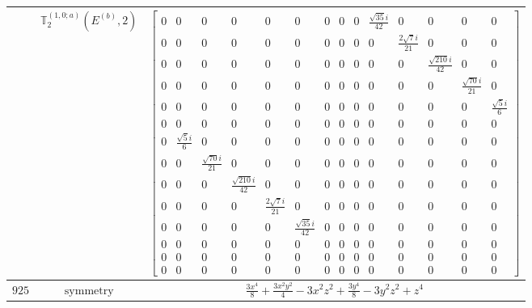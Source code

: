 \documentclass[fleqn,8pt,landscape]{jsarticle}
\begin{document}
\begin{longtable}{ccc}
$  $ & $ \mathbb{T}_{2}^{(1,0;a)}(E^{(b)},2) $ & $ \begin{bmatrix} 0 & 0 & 0 & 0 & 0 & 0 & 0 & 0 & 0 & \frac{\sqrt{35} i}{42} & 0 & 0 & 0 & 0 \\ 0 & 0 & 0 & 0 & 0 & 0 & 0 & 0 & 0 & 0 & \frac{2 \sqrt{7} i}{21} & 0 & 0 & 0 \\ 0 & 0 & 0 & 0 & 0 & 0 & 0 & 0 & 0 & 0 & 0 & \frac{\sqrt{210} i}{42} & 0 & 0 \\ 0 & 0 & 0 & 0 & 0 & 0 & 0 & 0 & 0 & 0 & 0 & 0 & \frac{\sqrt{70} i}{21} & 0 \\ 0 & 0 & 0 & 0 & 0 & 0 & 0 & 0 & 0 & 0 & 0 & 0 & 0 & \frac{\sqrt{5} i}{6} \\ 0 & 0 & 0 & 0 & 0 & 0 & 0 & 0 & 0 & 0 & 0 & 0 & 0 & 0 \\ 0 & \frac{\sqrt{5} i}{6} & 0 & 0 & 0 & 0 & 0 & 0 & 0 & 0 & 0 & 0 & 0 & 0 \\ 0 & 0 & \frac{\sqrt{70} i}{21} & 0 & 0 & 0 & 0 & 0 & 0 & 0 & 0 & 0 & 0 & 0 \\ 0 & 0 & 0 & \frac{\sqrt{210} i}{42} & 0 & 0 & 0 & 0 & 0 & 0 & 0 & 0 & 0 & 0 \\ 0 & 0 & 0 & 0 & \frac{2 \sqrt{7} i}{21} & 0 & 0 & 0 & 0 & 0 & 0 & 0 & 0 & 0 \\ 0 & 0 & 0 & 0 & 0 & \frac{\sqrt{35} i}{42} & 0 & 0 & 0 & 0 & 0 & 0 & 0 & 0 \\ 0 & 0 & 0 & 0 & 0 & 0 & 0 & 0 & 0 & 0 & 0 & 0 & 0 & 0 \\ 0 & 0 & 0 & 0 & 0 & 0 & 0 & 0 & 0 & 0 & 0 & 0 & 0 & 0 \\ 0 & 0 & 0 & 0 & 0 & 0 & 0 & 0 & 0 & 0 & 0 & 0 & 0 & 0 \end{bmatrix} $ \\ \hline
$ 925 $ & $ \text{symmetry} $ & $ \frac{3 x^{4}}{8} + \frac{3 x^{2} y^{2}}{4} - 3 x^{2} z^{2} + \frac{3 y^{4}}{8} - 3 y^{2} z^{2} + z^{4} $ \\

\end{longtable}
\end{document}
